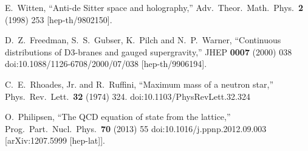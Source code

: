 \documentclass[11pt,epsf,letterpaper]{article}%
\begin{document}
\begin{thebibliography}{99}
E.~Witten, ``Anti-de Sitter space and holography,''
Adv.\ Theor.\ Math.\ Phys.\ \textbf{2} (1998) 253 [hep-th/9802150].


D.~Z.~Freedman, S.~S.~Gubser, K.~Pilch and
N.~P.~Warner, ``Continuous distributions of D3-branes and gauged
supergravity,'' JHEP \textbf{0007} (2000) 038
doi:10.1088/1126-6708/2000/07/038 [hep-th/9906194].


C.~E.~Rhoades, Jr. and R.~Ruffini, ``Maximum mass of
a neutron star,'' Phys.\ Rev.\ Lett.\ \textbf{32} (1974) 324. doi:10.1103/PhysRevLett.32.324

O.~Philipsen, ``The QCD equation of state from the
lattice,'' Prog.\ Part.\ Nucl.\ Phys.\ \textbf{70} (2013) 55
doi:10.1016/j.ppnp.2012.09.003 [arXiv:1207.5999 [hep-lat]].
\end{thebibliography}
\end{document}
